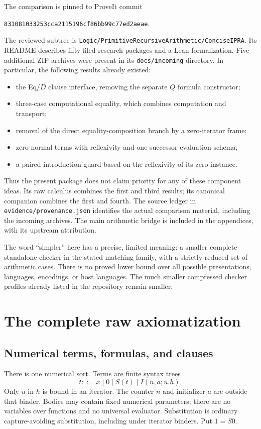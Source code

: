 \documentclass[11pt]{article}
\theoremstyle{definition}
\DeclareRobustCommand{\file}[1]{\nolinkurl{#1}}
\begin{document}
The comparison is pinned to ProveIt commit
\begin{center}\small\texttt{831081033253cca2115196cf86bb99c77ed2aeae}.\end{center}
The reviewed subtree is \file{Logic/PrimitiveRecursiveArithmetic/ConciseIPRA}.
Its README describes fifty filed research packages and a Lean formalization.
Five additional ZIP archives were present in its \file{docs/incoming}
directory. In particular, the following results already existed:
\begin{itemize}
\item the Eq/$D$ clause interface, removing the separate $Q$ formula constructor;
\item three-case computational equality, which combines computation and transport;
\item removal of the direct equality-composition branch by a zero-iterator frame;
\item zero-normal terms with reflexivity and one successor-evaluation schema;
\item a paired-introduction guard based on the reflexivity of its zero instance.
\end{itemize}
Thus the present package does not claim priority for any of these component
ideas. Its raw calculus combines the first and third results; its canonical
companion combines the first and fourth. The source ledger in
\file{evidence/provenance.json} identifies the actual comparison material,
including the incoming archives. The main arithmetic bridge is included in
the appendices, with its upstream attribution.

The word ``simpler'' here has a precise, limited meaning: a smaller complete
standalone checker in the stated matching family, with a strictly reduced
set of arithmetic cases. There is no proved lower bound over all possible
presentations, languages, encodings, or host languages. The much smaller
compressed checker profiles already listed in the repository remain smaller.

\section{The complete raw axiomatization}
\label{sec:raw-spec}

\subsection{Numerical terms, formulas, and clauses}

There is one numerical sort. Terms are finite syntax trees
\[
 t ::= x\mid 0\mid S(t)\mid I(n,a;u.h).
\]
Only $u$ in $h$ is bound in an iterator. The counter $n$ and initializer $a$
are outside that binder. Bodies may contain fixed numerical parameters;
there are no variables over functions and no universal evaluator.
Substitution is ordinary capture-avoiding substitution, including under
iterator binders. Put $1=S0$.
\end{document}
